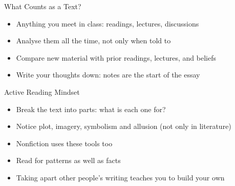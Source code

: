 \documentclass[aspectratio=169]{beamer}
\begin{document}
\begin{frame}{What Counts as a Text?}
\begin{itemize}
  \item Anything you meet in class: readings, lectures, discussions
  \item Analyse them all the time, not only when told to
  \item Compare new material with prior readings, lectures, and beliefs
  \item Write your thoughts down: notes are the start of the essay
\end{itemize}
\end{frame}

\begin{frame}{Active Reading Mindset}
\begin{itemize}
  \item Break the text into parts: what is each one for?
  \item Notice plot, imagery, symbolism and allusion (not only in literature)
  \item Nonfiction uses these tools too
  \item Read for patterns as well as facts
  \item Taking apart other people's writing teaches you to build your own
\end{itemize}
\end{frame}


\end{document}
